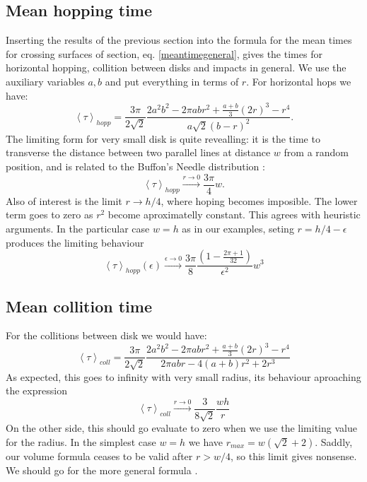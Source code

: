 \documentclass[a4paper,10pt, jcp, aps, preprint]{revtex4-1}
\newcommand{\mean}[1]{\left \langle #1 \right \rangle}
\begin{document}
\subsection{Mean hopping time}

Inserting the results of the previous section 
into the formula for the mean times for crossing
surfaces of section, eq. \ref{meantimegeneral}, gives the times for 
horizontal hopping, 
collition between disks and impacts in general. We use the auxiliary
variables $a,b$ and put everything in terms of $r$. For horizontal
hops we have:
\begin{equation}\label{hoptau}
 \mean{\tau}_{hopp} = 	
\frac{3 \pi}{2\sqrt{2}}
\frac{2 a^{2} b^{2}  - 2 \pi a b r^{2} + \textstyle \frac{a+b}{3}  (2r)^{3}  -  r^4}
{ a \sqrt{2}  ( b - r )^2}.
\end{equation}
The limiting form for very small disk is quite revealling: it is the time
to transverse the distance between two parallel lines at distance $w$ from
a random position, and is related to the Buffon's Needle distribution 
\cite{EScheinerman}:
\begin{equation}\label{hoptaulimit}
 \mean{\tau}_{hopp} \xrightarrow{r\rightarrow 0} 	
\frac{3 \pi}{4}w.
\end{equation}
Also of interest is the limit $r\rightarrow h/4$, where hoping becomes
imposible. The lower term goes to zero as $r^2$ become aproximatelly constant.
This agrees with heuristic arguments. 
In the particular case $w=h$ as in our examples,
seting $r=h/4-\epsilon$ produces the limiting behaviour 
\begin{equation}
 \mean{\tau}_{hopp}(\epsilon) \xrightarrow{\epsilon\rightarrow 0} 	
\frac{3 \pi}{8}
\frac{(1-\frac{2\pi+1}{32})}
{ \epsilon^2} w^3
\end{equation} 

\subsection{Mean collition time}

For the collitions between disk we would have:
\begin{equation}\label{colltau}
 \mean{\tau}_{coll} = 	
\frac{3 \pi}{2\sqrt{2}}
\frac {2 a^{2} b^{2}  - 2 \pi a b r^{2} + \textstyle \frac{a+b}{3}  (2r)^{3}  -  r^4}
{2\pi a b r -4(a+b)r^2+2r^3}
\end{equation}
As expected, this goes to infinity with very small radius, its behaviour
aproaching the expression
\begin{equation}\label{colltaulim0}
\mean{\tau}_{coll}  \xrightarrow{r\rightarrow 0} 
\frac{3}{8\sqrt{2}}\frac{wh}{r}
\end{equation}
On the other side, this should go evaluate to zero when
we use the limiting value for the radius. In the simplest
case  $w = h$ we have $r_{max}= w(\sqrt{2}+2)$. Saddly, our volume
formula ceases to be valid after $r>w/4$, so this limit gives nonsense.
We should go for the more general formula \cite{notascalculokarel}.
\end{document}
